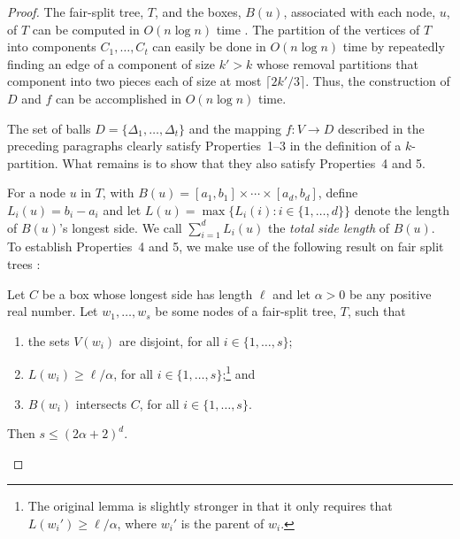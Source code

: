 \documentclass{patmorin}
\begin{document}
\begin{proof}
  The fair-split tree, $T$, and the boxes, $B(u)$, associated
  with each node, $u$, of $T$ can be computed in $O(n\log n)$ time
  \cite{callahan.kosaraju:decomposition}.  The partition of the vertices
  of $T$ into components $C_1,\ldots,C_t$ can easily be done in $O(n\log
  n)$ time by repeatedly finding an edge of a component of size $k'>k$
  whose removal partitions that component into two pieces each of size
  at most $\lceil 2k'/3\rceil$.  Thus, the construction of $D$ and $f$
  can be accomplished in $O(n\log n)$ time.

  The set of balls $D=\{\Delta_1,\ldots,\Delta_t\}$ and the mapping
  $f:V\to D$ described in the preceding paragraphs clearly satisfy
  Properties~1--3 in the definition of a $k$-partition.  What remains
  is to show that they also satisfy Properties~4 and 5. 

  For a node $u$ in $T$, with $B(u)=[a_1,b_1]\times\cdots\times[a_d,b_d]$,
  define $L_i(u)=b_i-a_i$ and let $L(u)=\max\{L_i(i):i\in\{1,\ldots,d\}\}$
  denote the length of $B(u)$'s longest side.  We call $\sum_{i=1}^d
  L_i(u)$ the \emph{total side length} of $B(u)$.  To establish
  Properties~4 and 5, we make use of the following result on fair split
  trees \cite[Lemma~9.4.3]{narasimhan.smid:geometric}:

  \begin{lem}
     Let $C$ be a box whose longest side has length $\ell$ and let
     $\alpha >0$ be any positive real number.  Let $w_1,\ldots,w_s$
     be some nodes of a fair-split tree, $T$, such that
     \begin{enumerate}
       \item the sets $V(w_i)$ are disjoint, for all $i\in\{1,\ldots,s\}$;
       \item $L(w_i)\ge \ell/\alpha$, for all
          $i\in\{1,\ldots,s\}$;\footnote{The original lemma
          \cite[Lemma~9.4.3]{narasimhan.smid:geometric} is slightly
          stronger in that it only requires that $L(w_i')\ge \ell/\alpha$,
          where $w_i'$ is the parent of $w_i$.} and
       \item $B(w_i)$ intersects $C$, for all $i\in\{1,\ldots,s\}$.
     \end{enumerate}
     Then $s\le (2\alpha + 2)^d$.
  \end{lem}


\end{proof}
\end{document}
